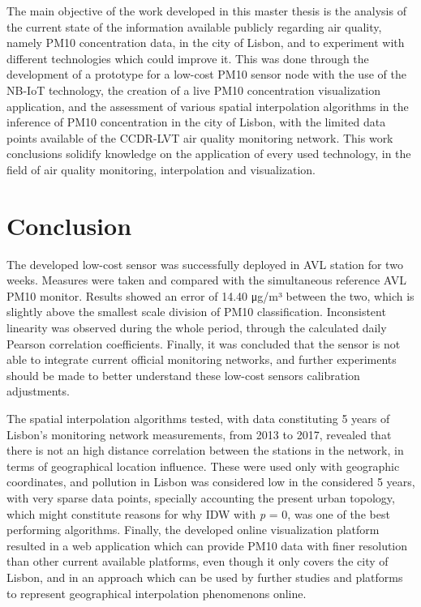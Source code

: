 \cleardoublepage
\label{chap:conclusion}

The main objective of the work developed in this master thesis is the analysis of the current state of the information available publicly regarding air quality, namely PM10 concentration data, in the city of Lisbon, and to experiment with different technologies which could improve it. This was done through the development of a prototype for a low-cost PM10 sensor node with the use of the NB-IoT technology, the creation of a live PM10 concentration visualization application, and the assessment of various spatial interpolation algorithms in the inference of PM10 concentration in the city of Lisbon, with the limited data points available of the CCDR-LVT air quality monitoring network.
This work conclusions solidify knowledge on the application of every used technology, in the field of air quality monitoring, interpolation and visualization.

\section{Conclusion}

The developed low-cost sensor was successfully deployed in AVL station for two weeks. Measures were taken and compared with the simultaneous reference AVL PM10 monitor. Results showed an error of 14.40 μg/m³ between the two, which is slightly above the smallest scale division of PM10 classification. Inconsistent linearity was observed during the whole period, through the calculated daily Pearson correlation coefficients. Finally, it was concluded that the sensor is not able to integrate current official monitoring networks, and further experiments should be made to better understand these low-cost sensors calibration adjustments.

The spatial interpolation algorithms tested, with data constituting 5 years of Lisbon's monitoring network measurements, from 2013 to 2017, revealed that there is not an high distance correlation between the stations in the network, in terms of geographical location influence. These were used only with geographic coordinates, and pollution in Lisbon was considered low in the considered 5 years, with very sparse data points, specially accounting the present urban topology, which might constitute reasons for why IDW with \textit{p} = 0, was one of the best performing algorithms. Finally, the developed online visualization platform resulted in a web application which can provide PM10 data with finer resolution than other current available platforms, even though it only covers the city of Lisbon, and in an approach which can be used by further studies and platforms to represent geographical interpolation phenomenons online.

